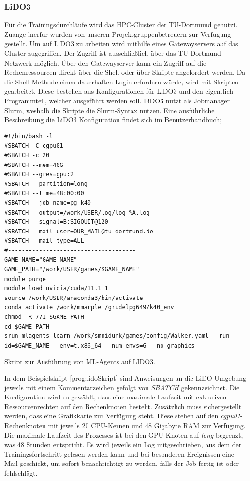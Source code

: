 \subsubsection{LiDO3}
Für die Trainingsdurchläufe wird das HPC-Cluster der TU-Dortmund genutzt. Zuänge hierfür wurden von unseren Projektgruppenbetreuern zur Verfügung gestellt. Um auf LiDO3 zu arbeiten wird mithilfe eines Gatewayservers auf das Cluster zugegriffen. Der Zugriff ist ausschließlich über das TU Dortmund Netzwerk möglich. Über den Gatewayserver kann ein Zugriff auf die Rechenressourcen direkt über die Shell oder über Skripte angefordert werden. Da die Shell-Methode einen dauerhaften Login erfordern würde, wird mit Skripten gearbeitet. Diese bestehen aus Konfigurationen für LiDO3 und den eigentlich Programmteil, welcher ausgeführt werden soll. LiDO3 nutzt als Jobmanager Slurm, weshalb die Skripte die Slurm-Syntax nutzen. Eine ausführliche Beschreibung die LiDO3 Konfiguration findet sich im Benutzerhandbuch\cite{lido};
\begin{listing}
	\begin{verbatim}
#!/bin/bash -l
#SBATCH -C cgpu01
#SBATCH -c 20
#SBATCH --mem=40G
#SBATCH --gres=gpu:2
#SBATCH --partition=long
#SBATCH --time=48:00:00
#SBATCH --job-name=pg_k40
#SBATCH --output=/work/USER/log/log_%A.log
#SBATCH --signal=B:SIGQUIT@120
#SBATCH --mail-user=OUR_MAIL@tu-dortmund.de
#SBATCH --mail-type=ALL
#-------------------------------------
GAME_NAME="GAME_NAME"
GAME_PATH="/work/USER/games/$GAME_NAME"
module purge
module load nvidia/cuda/11.1.1
source /work/USER/anaconda3/bin/activate
conda activate /work/mmarplei/grudelpg649/k40_env
chmod -R 771 $GAME_PATH
cd $GAME_PATH
srun mlagents-learn /work/smnidunk/games/config/Walker.yaml --run-id=$GAME_NAME --env=t.x86_64 --num-envs=6 --no-graphics
	\end{verbatim}
	\caption{Skript zur Ausführung von ML-Agents auf LIDO3.}
	\label{prog:lidoSkript}
\end{listing}

In dem Beispielskript \ref{prog:lidoSkript} sind Anweisungen an die LiDO-Umgebung jeweils mit einem Kommentarzeichen gefolgt von \emph{SBATCH} gekennzeichnet. Die Konfiguration wird so gewählt, dass eine maximale Laufzeit mit exklusiven Ressourcenrechten auf den Rechenknoten besteht. Zusätzlich muss sichergestellt werden, dass eine Grafikkarte zur Verfügung steht. Diese stehen auf den \emph{cgpu01}-Rechenknoten mit jeweils 20 CPU-Kernen und 48 Gigabyte RAM zur Verfügung. Die maximale Laufzeit des Prozesses ist bei den GPU-Knoten auf \emph{long} begrenzt, was 48 Stunden entspricht. Es wird jeweils ein Log mitgeschrieben, aus dem der Trainingsfortschritt gelesen werden kann und bei besonderen Ereignissen eine Mail geschickt, um sofort benachrichtigt zu werden, falls der Job fertig ist oder fehlschlägt.

